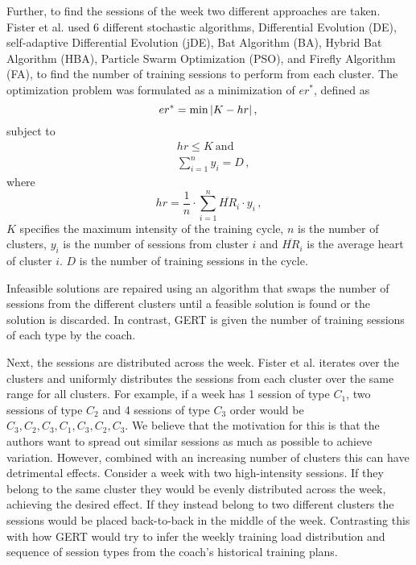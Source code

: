 Further, to find the sessions of the week two different approaches are taken.
Fister et al. used 6 different stochastic algorithms, Differential Evolution (DE), self-adaptive Differential Evolution (jDE), Bat Algorithm (BA), Hybrid Bat Algorithm (HBA), Particle Swarm Optimization (PSO), and Firefly Algorithm (FA), to find the number of training sessions to perform from each cluster.
The optimization problem was formulated as a minimization of $er^\ast$, defined as
\begin{equation}
    er^\ast = \min |K - hr|\,, \\
\end{equation}
subject to
\begin{equation}
\begin{split}
    &hr \leq K \ \mathrm{and}\\
    &\sum_{i=1}^n y_i = D\,,
\end{split}
\end{equation}
where 
\begin{equation}
    hr= \frac{1}{n} \cdot \sum_{i=1}^n \overline{HR}_i \cdot y_i \,,
\end{equation}
$K$ specifies the maximum intensity of the training cycle, $n$ is the number of clusters, $y_i$ is the number of sessions from cluster $i$ and $\overline{HR}_i$ is the average heart of cluster $i$. $D$ is the number of training sessions in the cycle.

Infeasible solutions are repaired using an algorithm that swaps the number of sessions from the different clusters until a feasible solution is found or the solution is discarded.
In contrast, GERT is given the number of training sessions of each type by the coach.

Next, the sessions are distributed across the week.
Fister et al. iterates over the clusters and uniformly distributes the sessions from each cluster over the same range for all clusters.
For example, if a week has 1 session of type $C_1$, two sessions of type $C_2$ and 4 sessions of type $C_3$ order would be $C_3, C_2, C_3, C_1, C_3, C_2, C_3$.
We believe that the motivation for this is that the authors want to spread out similar sessions as much as possible to achieve variation.
However, combined with an increasing number of clusters this can have detrimental effects.
Consider a week with two high-intensity sessions. 
If they belong to the same cluster they would be evenly distributed across the week, achieving the desired effect.
If they instead belong to two different clusters the sessions would be placed back-to-back in the middle of the week.
Contrasting this with how GERT would try to infer the weekly training load distribution and sequence of session types from the coach's historical training plans.

